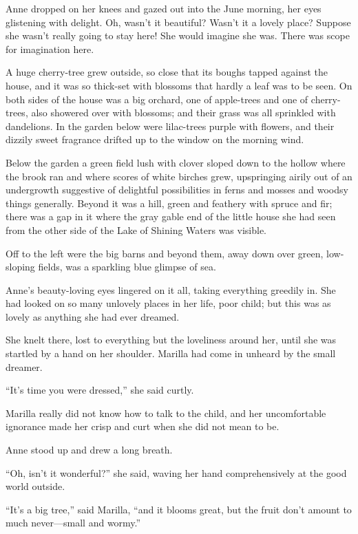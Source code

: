 \documentclass[a4paper]{article}
\begin{document}
Anne dropped on her knees and gazed out into the June morning, her eyes glistening with delight. Oh, wasn't it beautiful? Wasn't it a lovely place? Suppose she wasn't really going to stay here! She would imagine she was. There was scope for imagination here.

{\ttfamily A huge cherry-tree grew outside, so close that its boughs tapped against the house, and it was so thick-set with blossoms that hardly a leaf was to be seen. On both sides of the house was a big orchard, one of apple-trees and one of cherry-trees, also showered over with blossoms; and their grass was all sprinkled with dandelions. In the garden below were lilac-trees purple with flowers, and their dizzily sweet fragrance drifted up to the window on the morning wind.

Below the garden a green field lush with clover sloped down to the hollow where the brook ran and where scores of white birches grew, upspringing airily out of an undergrowth suggestive of delightful possibilities in ferns and mosses and woodsy things generally. Beyond it was a hill, green and feathery with spruce and fir; there was a gap in it where the gray gable end of the little house she had seen from the other side of the Lake of Shining Waters was visible.}

Off to the left were the big barns and beyond them, away down over green, low-sloping fields, was a sparkling blue glimpse of sea.

Anne's beauty-loving eyes lingered on it all, taking everything greedily in. She had looked on so many unlovely places in her life, poor child; but this was as lovely as anything she had ever dreamed.

\sffamily She knelt there, lost to everything but the loveliness around her, until she was startled by a hand on her shoulder. Marilla had come in unheard by the small dreamer.

``It's time you were dressed,'' she said curtly.

Marilla really did not know how to talk to the child, and her uncomfortable ignorance made her crisp and curt when she did not mean to be.

Anne stood up and drew a long breath.

``Oh, isn't it wonderful?'' she said, waving her hand comprehensively at the good world outside.

\rmfamily``It's a big tree,'' said Marilla, ``and it blooms great, but the fruit don't amount to much never---small and wormy.''
\end{document}
